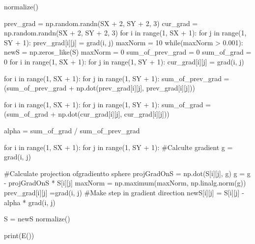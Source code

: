 \documentclass[ 12pt,x11names]{article}
\begin{document}
\begin{python}
normalize()

prev_grad =  np.random.randn(SX + 2, SY + 2, 3)
cur_grad = np.random.randn(SX + 2, SY + 2, 3)
for i in range(1, SX + 1):
    for j in range(1, SY + 1):
        prev_grad[i][j] = grad(i, j)
maxNorm = 10
while(maxNorm > 0.001):
    newS = np.zeros_like(S)
    maxNorm = 0
    sum_of_prev_grad = 0
    sum_of_grad  =  0
    for i in range(1, SX + 1):
        for j in range(1, SY + 1):
            cur_grad[i][j] = grad(i,  j)

    for i in range(1, SX + 1):
        for j in range(1, SY + 1):
            sum_of_prev_grad = (sum_of_prev_grad
            + np.dot(prev_grad[i][j], prev_grad[i][j]))

    for i in range(1, SX + 1):
        for j in range(1, SY + 1):
            sum_of_grad = (sum_of_grad
            + np.dot(cur_grad[i][j], cur_grad[i][j]))

    alpha = sum_of_grad / sum_of_prev_grad

    for i in range(1, SX + 1):
        for j in range(1, SY + 1):
            #Calculte gradient
            g = grad(i,  j)

            #Calculate projection ofgradientto sphere
            projGradOnS = np.dot(S[i][j], g)
            g = g - projGradOnS * S[i][j]
            maxNorm = np.maximum(maxNorm, np.linalg.norm(g))
            prev_grad[i][j] =grad(i, j)
            #Make step in gradient direction
            newS[i][j] = S[i][j] - alpha * grad(i, j)

    S = newS
    normalize()

print(E())

 \end{python}
\end{document}
